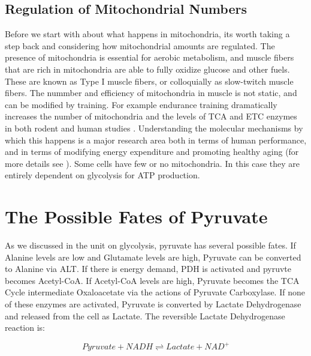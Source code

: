 \documentclass{tufte-handout}
\begin{document}
\subsection{Regulation of Mitochondrial Numbers}
Before we start with about what happens in mitochondria, its worth taking a step back and considering how mitochondrial amounts are regulated.  The presence of mitochondria is essential for aerobic metabolism, and muscle fibers that are rich in mitochondria are able to fully oxidize glucose and other fuels.  These are known as Type I muscle fibers, or colloquially as slow-twitch muscle fibers.  The nummber and efficiency of mitochondria in muscle is not static, and can be modified by training.  For example endurance training dramatically increases the number of mitochondria and the levels of TCA and ETC enzymes in both rodent and human studies \citep{Holloszy1967,Gollnick1972,Gollnick1973}.  Understanding the molecular mechanisms by which this happens is a major research area both in terms of human performance, and in terms of modifying energy expenditure and promoting healthy aging (for more details see \citet{Cartee2016}).  Some cells have few or no mitochondria.  In this case they are entirely dependent on glycolysis for ATP production.

\section{The Possible Fates of Pyruvate}

As we discussed in the unit on glycolysis, pyruvate has several possible fates.  If Alanine levels are low and Glutamate levels are high, Pyruvate can be converted to Alanine via ALT.  If there is energy demand, PDH is activated and pyruvte becomes Acetyl-CoA.  If Acetyl-CoA levels are high, Pyruvate becomes the TCA Cycle intermediate Oxaloacetate via the actions of Pyruvate Carboxylase.  If none of these enzymes are activated, Pyruvate is converted by Lactate Dehydrogenase and released from the cell as Lactate.  The reversible Lactate Dehydrogenase reaction is:

\begin{equation}\label{eq:ldh}
Pyruvate + NADH \rightleftharpoons Lactate + NAD^+
\end{equation}
\end{document}
